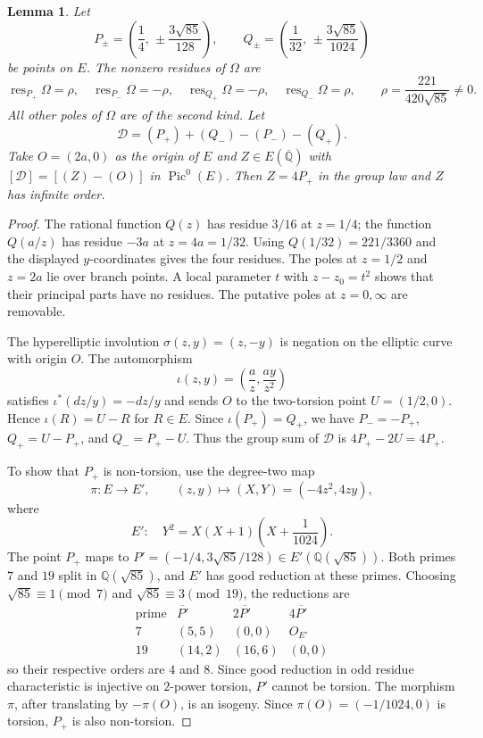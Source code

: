 \documentclass[11pt,a4paper,reqno]{amsart}
\numberwithin{equation}{section}
\theoremstyle{plain}
\newtheorem{lemma}[theorem]{Lemma}
\DeclareMathOperator{\res}{res}
\DeclareMathOperator{\Pic}{Pic}
\begin{document}
\begin{lemma}\label{lem:divisor}
Let
\[
 P_\pm=\left(\frac14,\,\pm\frac{3\sqrt{85}}{128}\right),\qquad
 Q_\pm=\left(\frac1{32},\,\pm\frac{3\sqrt{85}}{1024}\right)
\]
be points on $E$. The nonzero residues of $\Omega$ are
\[
 \res_{P_+}\Omega=\rho,\quad
 \res_{P_-}\Omega=-\rho,\quad
 \res_{Q_+}\Omega=-\rho,\quad
 \res_{Q_-}\Omega=\rho,
 \qquad \rho=\frac{221}{420\sqrt{85}}\neq0.
\]
All other poles of $\Omega$ are of the second kind. Let
\[
 \mathcal D=(P_+)+(Q_-)-(P_-)-(Q_+).
\]
Take $O=(2a,0)$ as the origin of $E$ and $Z\in E(\overline{\mathbb Q})$ with
$[\mathcal D]=[(Z)-(O)]$ in $\Pic^0(E)$. Then $Z=4P_+$ in the group law and $Z$ has infinite order.
\end{lemma}
\begin{proof}
The rational function $Q(z)$ has residue $3/16$ at $z=1/4$; the function
$Q(a/z)$ has residue $-3a$ at $z=4a=1/32$.
Using $Q(1/32)=221/3360$ and the displayed $y$-coordinates gives the four residues. The poles at $z=1/2$ and $z=2a$ lie over branch points. A local parameter $t$ with $z-z_0=t^2$ shows that their principal parts have no residues. The putative poles at $z=0,\infty$ are removable.

The hyperelliptic involution $\sigma(z,y)=(z,-y)$ is negation on the elliptic curve with origin $O$. The automorphism
\[
 \iota(z,y)=\left(\frac{a}{z},\frac{ay}{z^2}\right)
\]
satisfies $\iota^*(dz/y)=-dz/y$ and sends $O$ to the two-torsion point
$U=(1/2,0)$. Hence $\iota(R)=U-R$ for $R\in E$. Since
$\iota(P_+)=Q_+$, we have
$P_-=-P_+$, $Q_+=U-P_+$, and $Q_-=P_+-U$. Thus the group sum of $\mathcal D$ is
$4P_+-2U=4P_+$.

To show that $P_+$ is non-torsion, use the degree-two map
\[
 \pi:E\longrightarrow E',\qquad (z,y)\longmapsto
 (X,Y)=(-4z^2,4zy),
\]
where
\begin{equation}\label{eq:weierstrass}
 E':\quad Y^2=X(X+1)\left(X+\frac1{1024}\right).
\end{equation}
The point $P_+$ maps to
$P'=(-1/4,3\sqrt{85}/128)\in E'(\mathbb Q(\sqrt{85}))$.
Both primes $7$ and $19$ split in $\mathbb Q(\sqrt{85})$, and $E'$ has good reduction at these primes. Choosing $\sqrt{85}\equiv1\pmod7$ and $\sqrt{85}\equiv3\pmod{19}$, the reductions are
\[
 \begin{array}{c|c|c|c}
 \text{prime}&\overline{P'}&2\overline{P'}&4\overline{P'}\\\hline
 7&(5,5)&(0,0)&O_{E'}\\
 19&(14,2)&(16,6)&(0,0)
 \end{array}
\]
so their respective orders are $4$ and $8$. Since good reduction in odd residue characteristic is injective on $2$-power torsion, $P'$ cannot be torsion. The morphism $\pi$, after translating by $-\pi(O)$, is an isogeny. Since $\pi(O)=(-1/1024,0)$ is torsion, $P_+$ is also non-torsion.
\end{proof}
\end{document}
